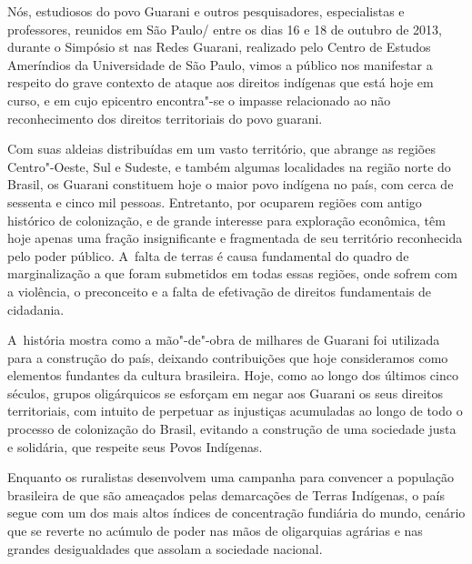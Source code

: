 
Nós, estudiosos do povo Guarani e outros pesquisadores, especialistas e
professores, reunidos em São Paulo/ entre os dias 16 e 18 de outubro
de 2013, durante o Simpósio st nas Redes Guarani, realizado pelo
Centro de Estudos Ameríndios da Universidade de São Paulo, vimos a
público nos manifestar a respeito do grave contexto de ataque aos
direitos indígenas que está hoje em curso, e em cujo epicentro
encontra"-se o impasse relacionado ao não reconhecimento dos direitos
territoriais do povo guarani.

Com suas aldeias distribuídas em um vasto território, que abrange as
regiões Centro"-Oeste, Sul e Sudeste, e também algumas localidades na
região norte do Brasil, os Guarani constituem hoje o maior povo
indígena no país, com cerca de sessenta e cinco mil pessoas.
Entretanto, por ocuparem regiões com antigo histórico de colonização, e
de grande interesse para exploração econômica, têm hoje apenas uma
fração insignificante e fragmentada de seu território reconhecida pelo
poder público. A~falta de terras é causa fundamental do quadro de
marginalização a que foram submetidos em todas essas regiões, onde
sofrem com a violência, o preconceito e a falta de efetivação de
direitos fundamentais de cidadania. 

A~história mostra como a mão"-de"-obra de milhares de Guarani foi
utilizada para a construção do país, deixando contribuições que hoje
consideramos como elementos fundantes da cultura brasileira. Hoje, como
ao longo dos últimos cinco séculos, grupos oligárquicos se esforçam em
negar aos Guarani os seus direitos territoriais, com intuito de
perpetuar as injustiças acumuladas ao longo de todo o processo de
colonização do Brasil, evitando a construção de uma sociedade justa e
solidária, que respeite seus Povos Indígenas.

Enquanto os ruralistas desenvolvem uma campanha para convencer a
população brasileira de que são ameaçados pelas demarcações de Terras
Indígenas, o país segue com um dos mais altos índices de concentração
fundiária do mundo, cenário que se reverte no acúmulo de poder nas mãos
de oligarquias agrárias e nas grandes desigualdades que assolam a
sociedade nacional. 


